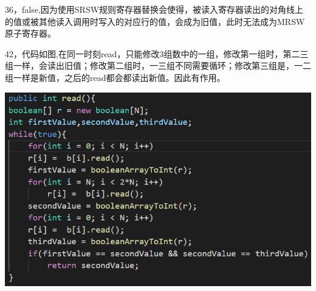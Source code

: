 \documentclass[UTF8]{ctexart}
\begin{document}
    36，false,因为使用SRSW规则寄存器替换会使得，被读入寄存器读出的对角线上的值或被其他读入调用时写入的对应行的值，会成为旧值，此时无法成为MRSW原子寄存器。
    
    42，代码如图,在同一时刻read，只能修改3组数中的一组，修改第一组时，第二三组一样，会读出旧值；修改第二组时，一三组不同需要循环；修改第三组是，一二组一样是新值，之后的read都会都读出新值。因此有作用。
    
    \centering
    \includegraphics{./1.PNG}
\end{document}
